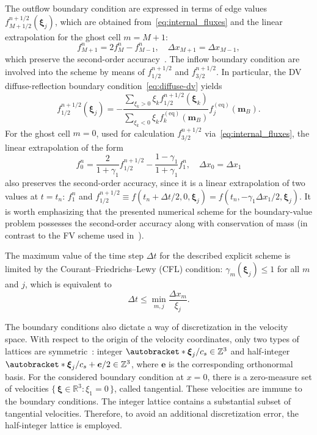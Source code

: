 \documentclass{elsarticle} %
\newcommand{\Set}[2]{\{\,{#1}:{#2}\,\}}
\DeclarePairedDelimiter\autobracket()       %
\newcommand{\br}[1]{\autobracket*{#1}}
\newcommand{\bxi}{\boldsymbol{\xi}}
\newcommand{\be}{\boldsymbol{e}}
\newcommand{\bm}{\boldsymbol{m}}
\newcommand{\equil}[1]{#1^\mathrm{(eq)}}
\begin{document}
The outflow boundary condition are expressed in terms of edge values \(f^{n+1/2}_{M+1/2}(\bxi_j)\),
which are obtained from~\eqref{eq:internal_fluxes}
and the linear extrapolation for the ghost cell \(m=M+1\):
\begin{equation}\label{eq:last_ghost}
    f^n_{M+1} = 2f^n_M - f^n_{M-1}, \quad \Delta{x}_{M+1} = \Delta{x}_{M-1},
\end{equation}
which preserve the second-order accuracy~\cite{LeVeque2002}.
The inflow boundary condition are involved into the scheme
by means of \(f^{n+1/2}_{1/2}\) and \(f^{n+1/2}_{3/2}\).
In particular, the DV diffuse-reflection boundary condition~\eqref{eq:diffuse-dv} yields
\begin{equation}\label{eq:first_flux}
    f^{n+1/2}_{1/2}(\bxi_j) = -\frac{\sum_{\xi_k>0} \xi_k f^{n+1/2}_{1/2}(\bxi_k)}
        {\sum_{\xi_k<0} \xi_k \equil{f}_k(\bm_B)}
        \equil{f}_j(\bm_B).
\end{equation}
For the ghost cell \(m=0\), used for calculation \(f^{n+1/2}_{3/2}\) via~\eqref{eq:internal_fluxes},
the linear extrapolation of the form
\begin{equation}\label{eq:first_ghost}
    f^n_0 = \frac2{1+\gamma_1}f^{n+1/2}_{1/2} - \frac{1-\gamma_1}{1+\gamma_1}f^n_1, \quad
    \Delta{x}_0 = \Delta{x}_1
\end{equation}
also preserves the second-order accuracy, since it is a linear extrapolation of two values at \(t=t_n\):
\(f^n_1\) and \(f^{n+1/2}_{1/2} \equiv f(t_n+\Delta{t}/2, 0, \bxi_j) = f(t_n, -\gamma_1\Delta{x_1}/2, \bxi_j)\).
It is worth emphasizing that the presented numerical scheme for the boundary-value problem
possesses the second-order accuracy along with conservation of mass
(in contrast to the FV scheme used in~\cite{Baranger2019}).

The maximum value of the time step \(\Delta{t}\) for the described explicit scheme
is limited by the Courant--Friedrichs--Lewy (CFL) condition:
\(\gamma_m(\bxi_j)\leq1\) for all \(m\) and \(j\), which is equivalent to
\begin{equation}\label{eq:CFL}
    \Delta{t} \leq \min_{m,j} \frac{\Delta{x_m}}{\xi_j}.
\end{equation}

The boundary conditions also dictate a way of discretization in the velocity space.
With respect to the origin of the velocity coordinates, only two types of lattices are symmetric~\cite{Inamuro1990}:
integer \(\br{\bxi_j/c_s} \in \mathbb{Z}^3\) and half-integer \(\br{\bxi_j/c_s + \be/2} \in \mathbb{Z}^3\),
where \(\be\) is the corresponding orthonormal basis.
For the considered boundary condition at \(x=0\), there is a zero-measure set of velocities
\(\Set{\bxi\in\mathbb{R}^3}{\xi_1=0}\), called tangential.
These velocities are immune to the boundary conditions.
The integer lattice contains a substantial subset of tangential velocities.
Therefore, to avoid an additional discretization error, the half-integer lattice is employed.
\end{document}
